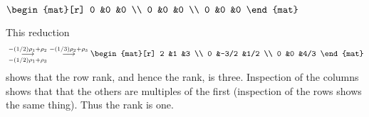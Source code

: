 \begin{exercises}
\begin{exparts*}
      \partsitem \(
        \begin{mat}[r]
          0  &0  &0  \\
          0  &0  &0  \\
          0  &0  &0
        \end{mat}  \)
    \end{exparts*}
    \begin{answer}
      \begin{exparts}
         \partsitem This reduction
           \begin{equation*}
             \mbox{}
             \grstep[-(1/2)\rho_1+\rho_3]{-(1/2)\rho_1+\rho_2}
             \;\grstep{-(1/3)\rho_2+\rho_3}
             \begin{mat}[r]
               2  &1     &3     \\
               0  &-3/2  &1/2   \\
               0  &0     &4/3
             \end{mat}
           \end{equation*}
           shows that the row rank, and hence the rank, is three.
         \partsitem Inspection of the columns shows that that the others
           are multiples of the first (inspection of the rows shows the same
           thing).
           Thus the rank is one.
           

\end{exparts}
\end{answer}
\end{exercises}
